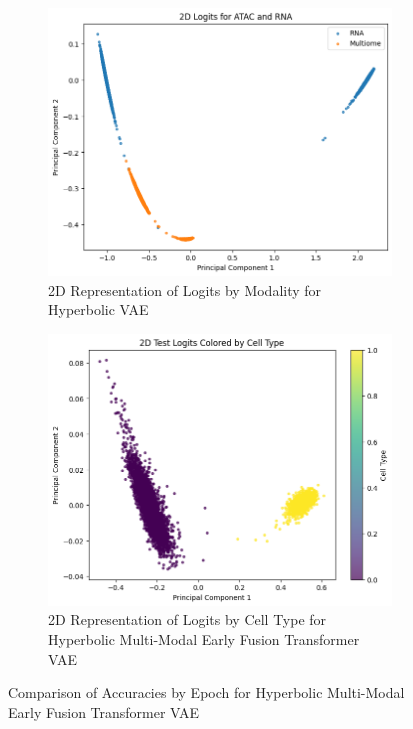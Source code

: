 \documentclass[11pt,a4paper]{article}
\begin{document}
\begin{figure}[H]
    \centering
    \begin{subfigure}[b]{0.45\linewidth}
        \centering
        \includegraphics[width=\linewidth]{hyperbolic_train.png}
        \caption{2D Representation of Logits by Modality for Hyperbolic VAE}
        \label{fig:figure7}
    \end{subfigure}
    \hfill
    \begin{subfigure}[b]{0.45\linewidth}
        \centering
        \includegraphics[width=\linewidth]{hyperbolic_test.png}
        \caption{2D Representation of Logits by Cell Type for Hyperbolic Multi-Modal Early Fusion Transformer VAE}
        \label{fig:figure12}
    \end{subfigure}

    \caption{Comparison of Accuracies by Epoch for Hyperbolic Multi-Modal Early Fusion Transformer VAE}
    \label{fig:comparison}
\end{figure}
\end{document}
